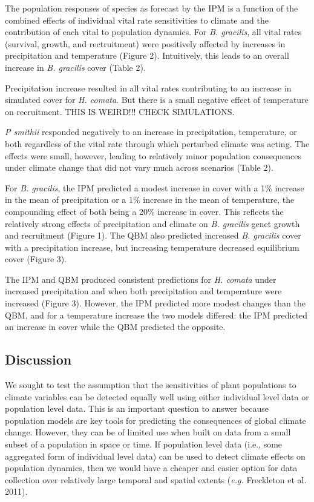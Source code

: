 \documentclass[12pt,]{article}
\begin{document}
The population responses of species as forecast by the IPM is a function
of the combined effects of individual vital rate sensitivities to
climate and the contribution of each vital to population dynamics. For
\emph{B. gracilis}, all vital rates (survival, growth, and rectruitment)
were positively affected by increases in precipitation and temperature
(Figure 2). Intuitively, this leads to an overall increase in \emph{B.
gracilis} cover (Table 2).

Precipitation increase resulted in all vital rates contributing to an
increase in simulated cover for \emph{H. comata}. But there is a small
negative effect of temperature on recruitment. THIS IS WEIRD!!! CHECK
SIMULATIONS.

\emph{P smithii} responded negatively to an increase in precipitation,
temperature, or both regardless of the vital rate through which
perturbed climate was acting. The effects were small, however, leading
to relatively minor population consequences under climate change that
did not vary much across scenarios (Table 2).

For \emph{B. gracilis}, the IPM predicted a modest increase in cover
with a 1\% increase in the mean of precipitation or a 1\% increase in
the mean of temperature, the compounding effect of both being a 20\%
increase in cover. This reflects the relatively strong effects of
precipitation and climate on \emph{B. gracilis} genet growth and
recruitment (Figure 1). The QBM also predicted increased \emph{B.
gracilis} cover with a precipitation increase, but increasing
temperature decreased equilibrium cover (Figure 3).

The IPM and QBM produced consistent predictions for \emph{H. comata}
under increased precipitation and when both precipitation and
temperature were increased (Figure 3). However, the IPM predicted more
modest changes than the QBM, and for a temperature increase the two
models differed: the IPM predicted an increase in cover while the QBM
predicted the opposite.

\subsection{Discussion}\label{discussion}

We sought to test the assumption that the sensitivities of plant
populations to climate variables can be detected equally well using
either individual level data or population level data. This is an
important question to answer because population models are key tools for
predicting the consequences of global climate change. However, they can
be of limited use when built on data from a small subset of a population
in space or time. If population level data (i.e., some aggregated form
of individual level data) can be used to detect climate effects on
population dynamics, then we would have a cheaper and easier option for
data collection over relatively large temporal and spatial extents
(\emph{e.g.} Freckleton et al. 2011).
\end{document}
